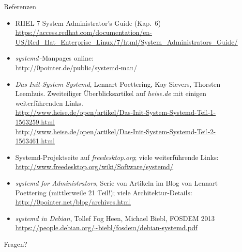 \begin{frame}[allowframebreaks]{Referenzen}
  \footnotesize
  \begin{itemize}
    \item RHEL 7 System Administrator's Guide
    (Kap.~6)\\ \url{https://access.redhat.com/documentation/en-US/Red_Hat_Enterprise_Linux/7/html/System_Administrators_Guide/}

    \item \emph{systemd}\,-Manpages online:\\
    \url{http://0pointer.de/public/systemd-man/}

    \item \emph{Das Init-System Systemd}, Lennart Poettering, Kay
    Sievers, Thorsten Leemhuis.  Zweiteiliger Überblicksartikel auf
    \emph{heise.de} mit einigen weiterführenden Links.\\
    \url{http://www.heise.de/open/artikel/Das-Init-System-Systemd-Teil-1-1563259.html}\\
    \url{http://www.heise.de/open/artikel/Das-Init-System-Systemd-Teil-2-1563461.html}

    \item Systemd-Projektseite auf \emph{freedesktop.org}; viele
    weiterführende Links:\\
    \url{http://www.freedesktop.org/wiki/Software/systemd/}

    \framebreak
    
    \item \emph{systemd for Administrators}, Serie von Artikeln im Blog
    von Lennart Poettering (mittlerweile 21 Teil!); viele
    Architektur-Details:\\
    \url{http://0pointer.net/blog/archives.html}

    \item \emph{systemd in Debian}, Tollef Fog Heen, Michael Biebl,
    FOSDEM 2013\\
    \url{https://people.debian.org/~biebl/fosdem/debian-systemd.pdf}
    
  \end{itemize}
\end{frame}


\begin{frame}[plain]
  \centerline{\Huge Fragen?}
\end{frame}



